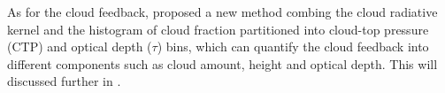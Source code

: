 

As for the cloud feedback, \cite{Zelinka2012computing1,Zelinka2012computing2} proposed a new method combing the cloud radiative kernel and the histogram of cloud fraction partitioned into cloud-top pressure (CTP) and optical depth ($\tau$) bins, which can quantify the cloud feedback into different components such as cloud amount, height and optical depth. This will discussed further in . %

